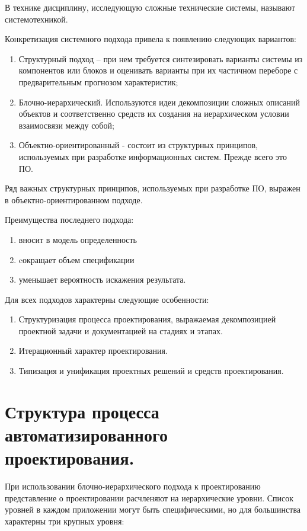 \documentclass[unicode, 12pt, a4paper, oneside]{article}
\begin{document}
В технике дисциплину, исследующую сложные технические системы, называют системотехникой.

Конкретизация системного подхода привела к появлению следующих вариантов:
\begin{enumerate}
\item Структурный подход – при нем требуется синтезировать варианты системы из компонентов или блоков и оценивать варианты при их частичном 
переборе с предварительным прогнозом характеристик;
\item Блочно-иерархический. Используются идеи декомпозиции сложных описаний объектов и соответственно средств их создания на иерархическом условии взаимосвязи между собой;
\item Объектно-ориентированный - состоит из структурных принципов, используемых при разработке информационных систем. Прежде всего это ПО.
\end{enumerate}

Ряд важных структурных принципов, используемых при разработке ПО, выражен в объектно-ориентированном подходе.
  
Преимущества последнего подхода:
\begin{enumerate}
\item вносит в модель определенность
\item cокращает объем спецификации
\item уменьшает вероятность искажения результата.
\end{enumerate}

Для всех подходов характерны следующие особенности:
\begin{enumerate}
\item Структуризация процесса проектирования, выражаемая декомпозицией проектной задачи и документацией на стадиях и этапах.
\item Итерационный характер проектирования.
\item Типизация и унификация проектных решений и средств проектирования.
\end{enumerate}

\section{Структура процесса автоматизированного проектирования.}

При использовании блочно-иерархического подхода к проектированию представление о проектировании расчленяют на иерархические уровни. Список уровней в каждом приложении могут быть специфическими, но для большинства характерны три крупных уровня:
\end{document}
